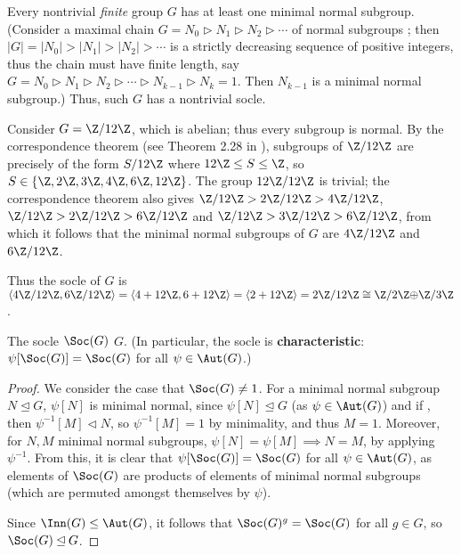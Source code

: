 Every nontrivial \textit{finite} group $G$ has at least one minimal normal subgroup. (Consider a maximal chain $G = N_0 \rhd N_1 \rhd N_2 \rhd \dotsb$ of normal subgroups ; then $|G| = |N_0| > |N_1| > |N_2| > \dotsb$ is a strictly decreasing sequence of positive integers, thus the chain must have finite length, say $G = N_0 \rhd N_1 \rhd N_2 \rhd \dotsb \rhd N_{k-1} \rhd N_k = 1$. Then $N_{k-1}$ is a minimal normal subgroup.) Thus, such $G$ has a nontrivial socle. 

\begin{example}\label{eg:socle_Z_12}
    Consider $G = \Z/12\Z$, which is abelian; thus every subgroup is normal. By the correspondence theorem (see Theorem 2.28 in \cite{rotman_intro_theory_groups1995}), subgroups of $\Z/12\Z$ are precisely of the form $S/12\Z$ where $12\Z \leq S \leq \Z$, so $S \in \{\Z,2\Z,3\Z,4\Z,6\Z,12\Z\}$. The group $12\Z/12\Z$ is trivial; the correspondence theorem also gives $\Z/12\Z > 2\Z/12\Z > 4\Z/12\Z$, $\Z/12\Z > 2\Z/12\Z > 6\Z/12\Z$ and $\Z/12\Z > 3\Z/12\Z > 6\Z/12\Z$, from which it follows that the minimal normal subgroups of $G$ are $4\Z/12\Z$ and $6\Z/12\Z$.

    Thus the socle of $G$ is $\langle 4\Z/12\Z,6\Z/12\Z \rangle = \langle 4 + 12\Z,6 + 12\Z \rangle = \langle 2 + 12\Z \rangle = 2\Z/12\Z \cong \Z/2\Z \added{3}{\oplus} \Z/3\Z$.
\end{example}

\begin{lemma}\label{lem:socle_is_normal}
    The socle $\Soc(G)$  $G$. (In particular, the socle is \textbf{characteristic}: $\psi[\Soc(G)] = \Soc(G)$ for all $\psi \in \Aut(G)$.)
\end{lemma}

\begin{proof}
    We consider the case that $\Soc(G) \neq 1$. For a minimal normal subgroup $N \unlhd G$, $\psi[N]$ is minimal normal, since $\psi[N] \unlhd G$ (as $\psi \in \Aut(G)$) and if , then $\psi^{-1}[M] \lhd N$, so $\psi^{-1}[M] = 1$ by minimality, and thus $M = 1$. Moreover, for $N,M$ minimal normal subgroups, $\psi[N] = \psi[M] \implies N = M$, by applying $\psi^{-1}$. From this, it is clear that $\psi[\Soc(G)] = \Soc(G)$ for all $\psi \in \Aut(G)$, as elements of $\Soc(G)$ are products of elements of minimal normal subgroups (which are permuted amongst themselves by $\psi$).

    Since $\Inn(G) \leq \Aut(G)$, it follows that $\Soc(G)^g = \Soc(G)$ for all $g \in G$, so $\Soc(G) \unlhd G$.
\end{proof}

